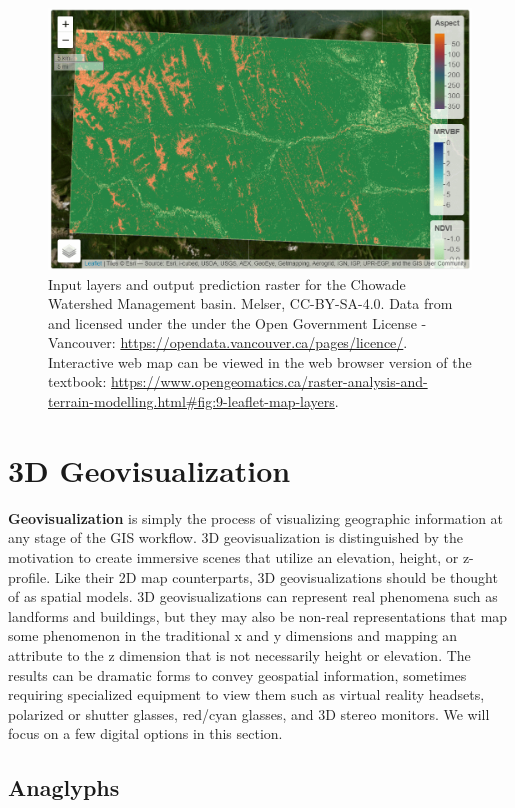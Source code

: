 \documentclass[
]{book}
\begin{document}
\begin{figure}
\includegraphics[width=0.75\linewidth]{images/09-leaflet-map-layers} \caption{Input layers and output prediction raster for the Chowade Watershed Management basin. Melser, CC-BY-SA-4.0. Data from \citep{city_of_vancouver_notitle_2009} and licensed under the under the Open Government License - Vancouver: \url{https://opendata.vancouver.ca/pages/licence/}. Interactive web map can be viewed in the web browser version of the textbook: \url{https://www.opengeomatics.ca/raster-analysis-and-terrain-modelling.html\#fig:9-leaflet-map-layers}.}\label{fig:9-leaflet-map-layers}
\end{figure}

\section{3D Geovisualization}\label{d-geovisualization}

\textbf{Geovisualization} is simply the process of visualizing geographic information at any stage of the GIS workflow. 3D geovisualization is distinguished by the motivation to create immersive scenes that utilize an elevation, height, or z-profile. Like their 2D map counterparts, 3D geovisualizations should be thought of as spatial models. 3D geovisualizations can represent real phenomena such as landforms and buildings, but they may also be non-real representations that map some phenomenon in the traditional x and y dimensions and mapping an attribute to the z dimension that is not necessarily height or elevation. The results can be dramatic forms to convey geospatial information, sometimes requiring specialized equipment to view them such as virtual reality headsets, polarized or shutter glasses, red/cyan glasses, and 3D stereo monitors. We will focus on a few digital options in this section.

\subsection{Anaglyphs}\label{anaglyphs}
\end{document}
